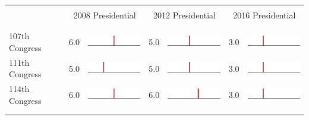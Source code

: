 
\begin{table}
\renewcommand{\arraystretch}{0.7}
 \begin{tabular}{l rm{7em} rm{7em} rm{7em}}
\hline \hline \\

{} & \multicolumn{2}{c}{2008 Presidential} & \multicolumn{2}{c}{2012 Presidential} & \multicolumn{2}{c}{2016 Presidential} \\

\\ \hline \\
107th Congress         &   6.0 &          \includegraphics[width=7em]{mini_hist/MN_2008_107} &   5.0 &          \includegraphics[width=7em]{mini_hist/MN_2012_107} &   3.0 &          \includegraphics[width=7em]{mini_hist/MN_2016_107} \\
111th Congress         &   5.0 &          \includegraphics[width=7em]{mini_hist/MN_2008_111} &   5.0 &          \includegraphics[width=7em]{mini_hist/MN_2012_111} &   3.0 &          \includegraphics[width=7em]{mini_hist/MN_2016_111} \\
114th Congress         &   6.0 &          \includegraphics[width=7em]{mini_hist/MN_2008_114} &   6.0 &          \includegraphics[width=7em]{mini_hist/MN_2012_114} &   3.0 &          \includegraphics[width=7em]{mini_hist/MN_2016_114} \\
\\ \hline \\ 

\end{tabular}
\end{table}
